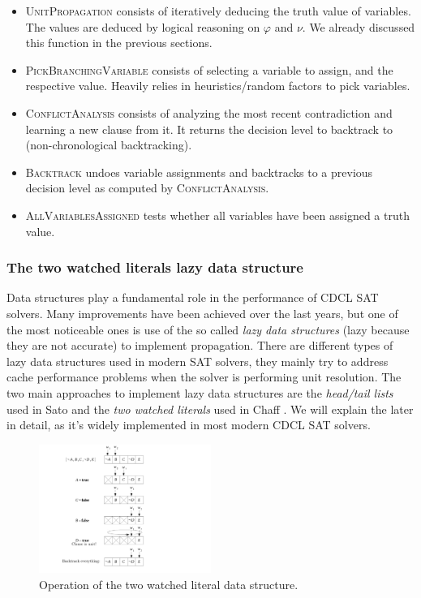 \documentclass[12pt]{diicc}
\begin{document}
\begin{itemize}
	\item \textsc{UnitPropagation} consists of iteratively deducing the truth value of variables. The values are deduced by logical reasoning on $\varphi$ and $\nu$. We already discussed this function in the previous sections.
	\item \textsc{PickBranchingVariable} consists of selecting a variable to assign, and the respective value. Heavily relies in heuristics/random factors to pick variables.
	\item \textsc{ConflictAnalysis} consists of analyzing the most recent contradiction and learning a new clause from it. It returns the decision level to backtrack to (non-chronological backtracking).
	\item \textsc{Backtrack} undoes variable assignments and backtracks to a previous decision level as computed by \textsc{ConflictAnalysis}.
	\item \textsc{AllVariablesAssigned} tests whether all variables have been assigned a truth value.
\end{itemize}


\subsubsection{The two watched literals lazy data structure}

Data structures play a fundamental role in the performance of CDCL SAT solvers. Many improvements have been achieved over the last years, but one of the most noticeable ones is use of the so called \textit{lazy data structures} (lazy because they are not accurate) to implement propagation. There are different types of lazy data structures used in modern SAT solvers, they mainly try to address cache performance problems when the solver is performing unit resolution. The two main approaches to implement lazy data structures are the \textit{head/tail lists} used in Sato \cite{sato} and the \textit{two watched literals} used in Chaff \cite{chaff}. We will explain the later in detail, as it's widely implemented in most modern CDCL SAT solvers.

\begin{figure}[h!]
	\centering
		\includegraphics[width=0.5\textwidth]{watchedliterals}
	\caption{Operation of the two watched literal data structure.}
	\label{fig:watched literals}
\end{figure}
\end{document}
